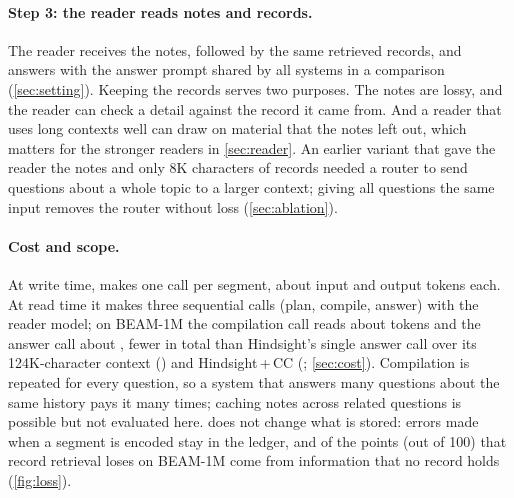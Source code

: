 \paragraph{Step 3: the reader reads notes and records.}
The reader receives the notes, followed by the same retrieved records, and answers with the answer prompt shared by all systems in a comparison (\cref{sec:setting}). Keeping the records serves two purposes. The notes are lossy, and the reader can check a detail against
the record it came from. And a reader that uses long contexts well can draw on material that the notes left out,
which matters for the stronger readers in \cref{sec:reader}. An earlier variant that gave the reader the notes and
only 8K characters of records needed a router to send questions about a whole topic to a larger context; giving all
questions the same input removes the router without loss (\cref{sec:ablation}).

\paragraph{Cost and scope.}
At write time, \method{} makes one call per segment, about  input and  output tokens each.
At read time it makes three sequential calls (plan, compile, answer) with the reader model; on BEAM-1M the compilation call reads about  tokens and the answer call about , fewer in total than Hindsight's single answer call over its 124K-character context () and Hindsight\,+\,CC (; \cref{sec:cost}). Compilation is repeated for every question, so a system
that answers many questions about the same history pays it many times; caching notes across related questions is
possible but not evaluated here. \method{} does not change what is stored: errors made when a segment is encoded stay
in the ledger, and  of the  points (out of 100) that record retrieval loses on BEAM-1M come from information that no record holds (\cref{fig:loss}).
